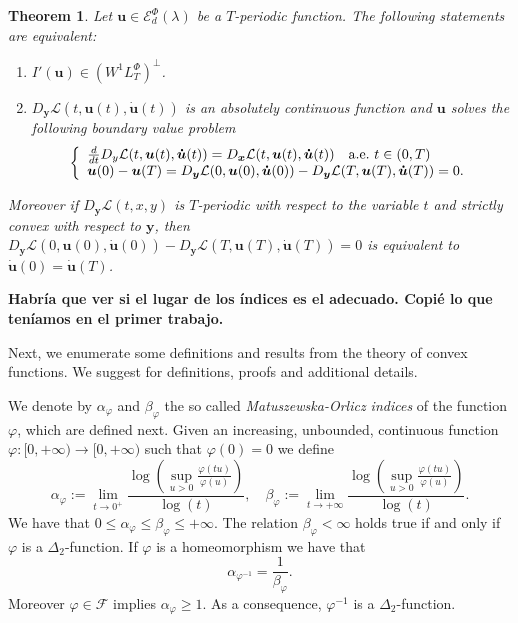 \documentclass[twoside]{article}
\newtheorem{thm}{Theorem}[section]
\theoremstyle{remark}
\newcommand{\lphi}{L^{\Phi}}
\newcommand{\wphi}{W^{1}\lphi}
\newcommand{\domi}{\mathcal{E}^{\Phi}_d(\lambda)}
\renewcommand{\b}[1]{\boldsymbol{#1}}
\renewcommand{\leq}{\leqslant}
\begin{document}
\begin{thm}\label{critpoint} Let $\b{u}\in\domi$ be  a $T$-periodic function. The following statements are equivalent:
\begin{enumerate}
 \item $I'(\b{u})\in\left( \wphi_T\right)^{\perp}$.
 \item  $D_{\b{y}}\mathcal{L}(t,\b{u}(t),\b{\dot{u}}(t))$ is an absolutely continuous function and $\b{u}$ solves the following boundary value problem
 \begin{equation}\label{ecualagran2}
    \left\{%
\begin{array}{ll}
   \frac{d}{dt} D_{y}\mathcal{L}(t,\b{u}(t),\b{\dot{u}}(t))= D_{\b{x}}\mathcal{L}(t,\b{u}(t),\b{\dot{u}}(t)) \quad \hbox{a.e.}\ t \in (0,T)\\
    \b{u}(0)-\b{u}(T)=D_{\b{y}}\mathcal{L}(0,\b{u}(0),\b{\dot{u}}(0))-D_{\b{y}}\mathcal{L}(T,\b{u}(T),\b{\dot{u}}(T))=0.
\end{array}%
\right.
\end{equation}
\end{enumerate}
Moreover if $D_{\b{y}}\mathcal{L}(t,x,y)$ is $T$-periodic with respect to the variable $t$ and strictly convex with respect to $\b{y}$, then
$D_{\b{y}}\mathcal{L}(0,\b{u}(0),\b{\b{\dot{\b{u}}}}(0))-D_{\b{y}}\mathcal{L}(T,\b{u}(T),\b{\dot{u}}(T))=0$ is equivalent to $\b{\dot{u}}(0)=\b{\dot{u}}(T)$.
\end{thm}


{\bf Habr\'ia que ver si el lugar de los \'indices es el adecuado. Copi\'e lo que ten\'iamos en el 
primer trabajo.}


Next, we enumerate some definitions and results from the theory of convex functions. 
We suggest \cite{FK97, GP77, KR, M, rao1991theory} for definitions, proofs and additional details.

We denote by $\alpha_{\varphi}$ and $\beta_{\varphi}$ the so called  \emph{Matuszewska-Orlicz indices} of the function $\varphi$, which are defined next. Given
an increasing, unbounded, continuous function  \linebreak $\varphi:[ 0,+\infty)\to [0,+\infty)$ such that $\varphi(0)=0$ we define
\begin{equation}\label{MO_indices}
    \alpha_{\varphi}:=\lim\limits_{t\to 0^{+}}\frac{\log \left (\sup\limits_{u>0}\frac{\varphi(t u)}{\varphi(u)} \right ) }{\log(t)},\quad
    \beta_{\varphi}:=\lim\limits_{t\to +\infty}\frac{\log \left  (\sup\limits_{u>0}\frac{\varphi(t u)}{\varphi(u)}\right )}{\log(t)}.
\end{equation}
We have that $0\leq \alpha_{\varphi}\leq \beta_{\varphi}\leq +\infty$. The relation $\beta_{\varphi}<\infty$ holds true if and only if $\varphi$ is a
$\Delta_2$-function. If $\varphi$ is a homeomorphism  we have that
\begin{equation}\label{inv_indices}
    \alpha_{\varphi^{-1}}=\frac{1}{\beta_{\varphi}}.
\end{equation}
Moreover $\varphi\in\mathcal{F}$ implies  $\alpha_{\varphi}\geq 1$. As a consequence, $\varphi^{-1}$ is a $\Delta_2$-function.
\end{document}
